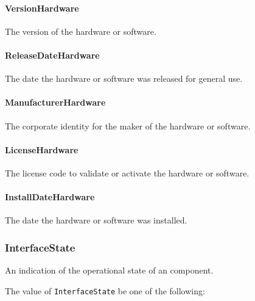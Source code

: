 \paragraph{VersionHardware}\mbox{}
\label{sec:VersionHardware}



The version of the hardware or software.


\paragraph{ReleaseDateHardware}\mbox{}
\label{sec:ReleaseDateHardware}



The date the hardware or software was released for general use.



\paragraph{ManufacturerHardware}\mbox{}
\label{sec:ManufacturerHardware}



The corporate identity for the maker of the hardware or software.



\paragraph{LicenseHardware}\mbox{}
\label{sec:LicenseHardware}



The license code to validate or activate the hardware or software.


\paragraph{InstallDateHardware}\mbox{}
\label{sec:InstallDateHardware}



The date the hardware or software was installed.


\subsubsection{InterfaceState}
\label{sec:InterfaceState}



An indication of the operational state of an  component.


The value of \texttt{InterfaceState} \MUST be one of the following: 


